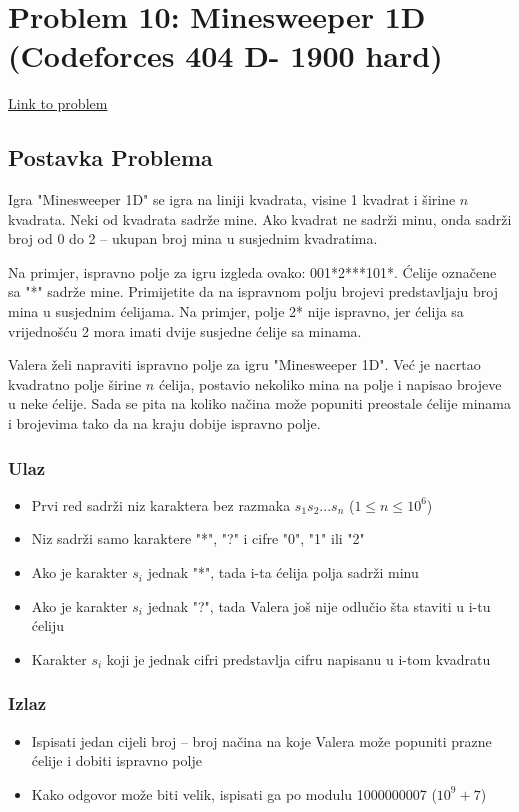 \section{Problem 10: Minesweeper 1D (Codeforces 404 D- 1900 hard)}
\href{https://codeforces.com/contest/404/problem/D}{Link to problem}

\subsection{Postavka Problema}
Igra "Minesweeper 1D" se igra na liniji kvadrata, visine 1 kvadrat i širine $n$ kvadrata. Neki od kvadrata sadrže mine. Ako kvadrat ne sadrži minu, onda sadrži broj od 0 do 2 -- ukupan broj mina u susjednim kvadratima.

Na primjer, ispravno polje za igru izgleda ovako: 001*2***101*. Ćelije označene sa "*" sadrže mine. Primijetite da na ispravnom polju brojevi predstavljaju broj mina u susjednim ćelijama. Na primjer, polje 2* nije ispravno, jer ćelija sa vrijednošću 2 mora imati dvije susjedne ćelije sa minama.

Valera želi napraviti ispravno polje za igru "Minesweeper 1D". Već je nacrtao kvadratno polje širine $n$ ćelija, postavio nekoliko mina na polje i napisao brojeve u neke ćelije. Sada se pita na koliko načina može popuniti preostale ćelije minama i brojevima tako da na kraju dobije ispravno polje.

\subsubsection{Ulaz}
\begin{itemize}
    \item Prvi red sadrži niz karaktera bez razmaka $s_1s_2...s_n$ ($1 \leq n \leq 10^6$)
    \item Niz sadrži samo karaktere "*", "?" i cifre "0", "1" ili "2"
    \item Ako je karakter $s_i$ jednak "*", tada i-ta ćelija polja sadrži minu
    \item Ako je karakter $s_i$ jednak "?", tada Valera još nije odlučio šta staviti u i-tu ćeliju
    \item Karakter $s_i$ koji je jednak cifri predstavlja cifru napisanu u i-tom kvadratu
\end{itemize}

\subsubsection{Izlaz}
\begin{itemize}
    \item Ispisati jedan cijeli broj -- broj načina na koje Valera može popuniti prazne ćelije i dobiti ispravno polje
    \item Kako odgovor može biti velik, ispisati ga po modulu 1000000007 ($10^9 + 7$)
\end{itemize}

